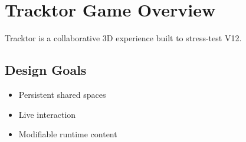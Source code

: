 \section{Tracktor Game Overview}

Tracktor is a collaborative 3D experience built to stress-test V12.

\subsection{Design Goals}
\begin{itemize}
	\item Persistent shared spaces
	\item Live interaction
	\item Modifiable runtime content
\end{itemize}
